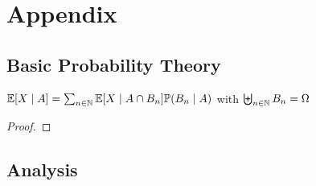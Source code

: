 \chapter{Appendix}
\section{Basic Probability Theory}
\begin{lemma}\label{appx1}
    \(\mathbb{E}[X\mid A]=\sum_{n\in\mathbb{N}} \mathbb{E}[X\mid A \cap B_n] \mathbb{P}(B_n \mid A) \) with \(\biguplus_{n\in\mathbb{N}}B_n=\Omega \)
\end{lemma}
\begin{proof}
\end{proof}
\section{Analysis}
\endinput
